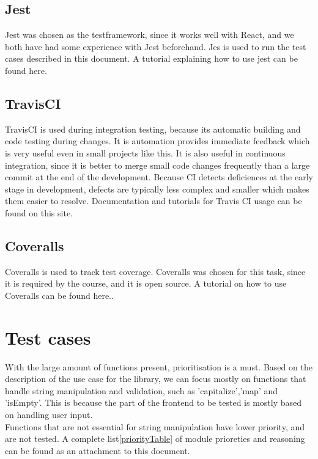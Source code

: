 \documentclass[a4paper, 12pt]{article}
\begin{document}
    \subsection{Jest}

    Jest\cite{Jest} was chosen as the testframework, since it works well with React, and we both have had some experience with Jest beforehand.
    Jes is used to run the test cases described in this document. A tutorial explaining how to use jest can be found here.\cite{JestTutorial}

    \subsection{TravisCI}
    
    TravisCI\cite{Travis} is used during integration testing, because its automatic building and code testing during changes. It is automation provides immediate feedback which 
    is very useful even in small projects like this. It is also useful in continuous integration, since it is better to merge small code changes frequently than a large commit at 
    the end of the development. Because CI detects deficiences at the early stage in development, defects are typically less complex and smaller which makes them easier to resolve.
    Documentation and tutorials for Travis CI usage can be found on this site. \cite{TravisTutorial}

    \subsection{Coveralls}

    Coveralls\cite{coveralls} is used to track test coverage. Coveralls was chosen for this task, since it is required by the course, and it is open source. 
    A tutorial on how to use Coveralls can be found here.\cite{coverallsTutorial}.

\section{Test cases}

With the large amount of functions present, prioritisation is a must.
Based on the description of the use case for the library, we can focus mostly on functions that handle string manipulation and validation,
such as 'capitalize','map' and 'isEmpty'. This is because the part of the frontend to be tested  is mostly based on handling user input.
\\
Functions that are not essential for string manipulation have lower priority, and are not tested.
A complete list\ref{priorityTable} of module prioreties and reasoning can be found as an attachment to this document.
\end{document}
